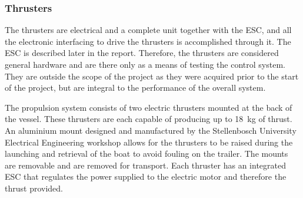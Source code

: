 		\subsubsection{Thrusters}
		The thrusters are electrical and a complete unit together with the ESC, and all the electronic interfacing to drive the thrusters is accomplished through it. The ESC is described later in the report. Therefore, the thrusters are considered general hardware and are there only as a means of testing the control system. They are outside the scope of the project as they were acquired prior to the start of the project, but are integral to the performance of the overall system.\par 
		The propulsion system consists of two electric thrusters mounted at the back of the vessel. These thrusters are each capable of producing up to \SI{18}{\kilogram} of thrust. An aluminium mount designed and manufactured by the Stellenbosch University Electrical Engineering workshop allows for the thrusters to be raised during the launching and retrieval of the boat to avoid fouling on the trailer. The mounts are removable and are removed for transport. Each thruster has an integrated ESC that regulates the power supplied to the electric motor and therefore the thrust provided.

